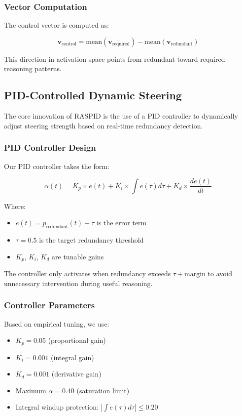 \documentclass{article}
\begin{document}
\subsubsection{Vector Computation}

The control vector is computed as:

\begin{equation}
\mathbf{v}_{\text{control}} = \text{mean}(\mathbf{v}_{\text{required}}) - \text{mean}(\mathbf{v}_{\text{redundant}})
\end{equation}

This direction in activation space points from redundant toward required reasoning patterns.

\subsection{PID-Controlled Dynamic Steering}

The core innovation of RASPID is the use of a PID controller to dynamically adjust steering strength based on real-time redundancy detection.

\subsubsection{PID Controller Design}

Our PID controller takes the form:

\begin{equation}
\alpha(t) = K_p \times e(t) + K_i \times \int e(\tau)d\tau + K_d \times \frac{de(t)}{dt}
\end{equation}

Where:
\begin{itemize}
\item $e(t) = p_{\text{redundant}}(t) - \tau$ is the error term
\item $\tau = 0.5$ is the target redundancy threshold
\item $K_p$, $K_i$, $K_d$ are tunable gains
\end{itemize}

The controller only activates when redundancy exceeds $\tau + \text{margin}$ to avoid unnecessary intervention during useful reasoning.

\subsubsection{Controller Parameters}

Based on empirical tuning, we use:
\begin{itemize}
\item $K_p = 0.05$ (proportional gain)
\item $K_i = 0.001$ (integral gain)
\item $K_d = 0.001$ (derivative gain)
\item Maximum $\alpha = 0.40$ (saturation limit)
\item Integral windup protection: $|\int e(\tau)d\tau| \leq 0.20$
\end{itemize}
\end{document}
